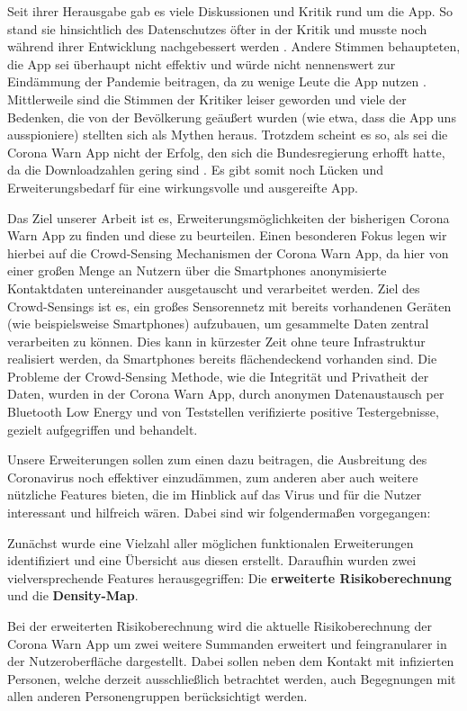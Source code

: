 \documentclass[conference,compsoc]{IEEEtran}
\begin{document}
Seit ihrer Herausgabe gab es viele Diskussionen und Kritik rund um die App. 
So stand sie hinsichtlich des Datenschutzes öfter in der Kritik und musste noch während ihrer Entwicklung nachgebessert werden \cite{CWAKritik}. 
Andere Stimmen behaupteten, die App sei überhaupt nicht effektiv und würde nicht nennenswert zur Eindämmung der Pandemie beitragen, da zu wenige Leute die App nutzen \cite{CWAKritik2}.
Mittlerweile sind die Stimmen der Kritiker leiser geworden und viele der Bedenken, die von der Bevölkerung geäußert wurden (wie etwa, dass die App uns ausspioniere) stellten sich als Mythen heraus. 
Trotzdem scheint es so, als sei die Corona Warn App nicht der Erfolg, den sich die Bundesregierung erhofft hatte, da die Downloadzahlen gering sind \cite{Downloads}. 
Es gibt somit noch Lücken und Erweiterungsbedarf für eine wirkungsvolle und ausgereifte App.

Das Ziel unserer Arbeit ist es, Erweiterungsmöglichkeiten der bisherigen Corona Warn App zu finden und diese zu beurteilen. 
Einen besonderen Fokus legen wir hierbei auf die Crowd-Sensing Mechanismen der Corona Warn App, da hier von einer großen Menge an Nutzern über die Smartphones anonymisierte Kontaktdaten untereinander ausgetauscht und verarbeitet werden.
Ziel des Crowd-Sensings ist es, ein großes Sensorennetz mit bereits vorhandenen Geräten (wie beispielsweise Smartphones) aufzubauen, um gesammelte Daten zentral verarbeiten zu können. 
Dies kann in kürzester Zeit ohne teure Infrastruktur realisiert werden, da Smartphones bereits flächendeckend vorhanden sind.
Die Probleme der Crowd-Sensing Methode, wie die Integrität und Privatheit der Daten, wurden in der Corona Warn App, durch 
anonymen Datenaustausch per Bluetooth Low Energy und von Teststellen verifizierte positive Testergebnisse, gezielt aufgegriffen und behandelt.

Unsere Erweiterungen sollen zum einen dazu beitragen, die Ausbreitung des Coronavirus noch effektiver einzudämmen, 
zum anderen aber auch weitere nützliche Features bieten, die im Hinblick auf das Virus und für die Nutzer interessant und hilfreich wären.
Dabei sind wir folgendermaßen vorgegangen: 

Zunächst wurde eine Vielzahl aller möglichen funktionalen Erweiterungen identifiziert und eine Übersicht aus diesen erstellt. 
Daraufhin wurden zwei vielversprechende Features herausgegriffen: Die \textbf{erweiterte Risikoberechnung} und die \textbf{Density-Map}.

Bei der erweiterten Risikoberechnung wird die aktuelle Risikoberechnung der Corona Warn App um zwei weitere Summanden erweitert und feingranularer in der Nutzeroberfläche dargestellt. 
Dabei sollen neben dem Kontakt mit infizierten Personen, welche derzeit ausschließlich betrachtet werden, auch Begegnungen mit allen anderen Personengruppen berücksichtigt werden.
\end{document}
